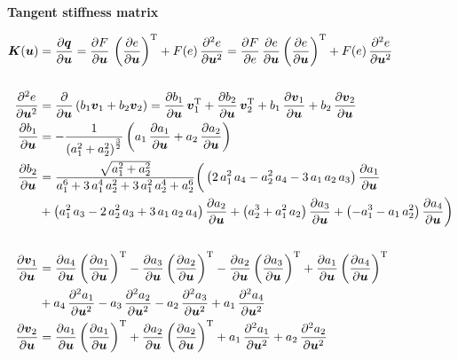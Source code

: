 \textbf{Tangent stiffness matrix}

\begin{align*}
\boldsymbol{K}(\boldsymbol{u}) &= \frac{\partial \boldsymbol{q}}{\partial \boldsymbol{u}} = \frac{\partial F}{\partial \boldsymbol{u}}\,\left(\frac{\partial e}{\partial \boldsymbol{u}}\right)^{\rm{T}} + F(e)\,\frac{\partial^2 e}{\partial \boldsymbol{u}^2} = \frac{\partial F}{\partial e}\,\frac{\partial e}{\partial \boldsymbol{u}}\left(\frac{\partial e}{\partial \boldsymbol{u}}\right)^{\rm{T}} + F(e)\,\frac{\partial^2 e}{\partial \boldsymbol{u}^2}\\
\\
\frac{\partial^2 e}{\partial \boldsymbol{u}^2} &= \frac{\partial}{\partial \boldsymbol{u}}\left(b_1\boldsymbol{v}_1 + b_2\boldsymbol{v}_2\right) = \frac{\partial b_1}{\partial \boldsymbol{u}}\,\boldsymbol{v}_1^{\rm{T}} + \frac{\partial b_2}{\partial \boldsymbol{u}}\,\boldsymbol{v}_2^{\rm{T}} + b_1\,\frac{\partial \boldsymbol{v}_1}{\partial \boldsymbol{u}} + b_2\,\frac{\partial \boldsymbol{v}_2}{\partial \boldsymbol{u}}\\
\frac{\partial b_1}{\partial \boldsymbol{u}} &= -\frac{1}{\left(a_1^2 + a_2^2\right)^{\frac{3}{2}}}\left(a_1\,\frac{\partial a_1}{\partial \boldsymbol{u}} + a_2\,\frac{\partial a_2}{\partial \boldsymbol{u}}\right)\\
\frac{\partial b_2}{\partial \boldsymbol{u}} &= \frac{\sqrt{a_1^2 + a_2^2}}{a_1^6 + 3\,a_1^4\,a_2^2 + 3\,a_1^2\,a_2^4 + a_2^6}\bigg(\left(2\,a_1^2\,a_4 - a_2^2\,a_4 - 3\,a_1\,a_2\,a_3\right)\frac{\partial a_1}{\partial \boldsymbol{u}}\\
&+ \left(a_1^2\,a_3 - 2\,a_2^2\,a_3 + 3\,a_1\,a_2\,a_4\right)\frac{\partial a_2}{\partial \boldsymbol{u}} + \left(a_2^3 + a_1^2\,a_2\right)\frac{\partial a_3}{\partial \boldsymbol{u}} + \left(-a_1^3 - a_1\,a_2^2\right)\frac{\partial a_4}{\partial \boldsymbol{u}}\bigg)\\
\\
\frac{\partial \boldsymbol{v}_1}{\partial \boldsymbol{u}} &= \frac{\partial a_4}{\partial \boldsymbol{u}}\left(\frac{\partial a_1}{\partial \boldsymbol{u}}\right)^{\rm{T}} - \frac{\partial a_3}{\partial \boldsymbol{u}}\left(\frac{\partial a_2}{\partial \boldsymbol{u}}\right)^{\rm{T}} - \frac{\partial a_2}{\partial \boldsymbol{u}}\left(\frac{\partial a_3}{\partial \boldsymbol{u}}\right)^{\rm{T}} + \frac{\partial a_1}{\partial \boldsymbol{u}}\left(\frac{\partial a_4}{\partial \boldsymbol{u}}\right)^{\rm{T}}\\
&+ a_4\,\frac{\partial^2 a_1}{\partial \boldsymbol{u}^2} - a_3\,\frac{\partial^2 a_2}{\partial \boldsymbol{u}^2} - a_2\,\frac{\partial^2 a_3}{\partial \boldsymbol{u}^2} + a_1\,\frac{\partial^2 a_4}{\partial \boldsymbol{u}^2}\\
\frac{\partial \boldsymbol{v}_2}{\partial \boldsymbol{u}} &=  \frac{\partial a_1}{\partial \boldsymbol{u}}\left(\frac{\partial a_1}{\partial \boldsymbol{u}}\right)^{\rm{T}} + \frac{\partial a_2}{\partial \boldsymbol{u}}\left(\frac{\partial a_2}{\partial \boldsymbol{u}}\right)^{\rm{T}} + a_1\,\frac{\partial^2 a_1}{\partial \boldsymbol{u}^2} + a_2\,\frac{\partial^2 a_2}{\partial \boldsymbol{u}^2}
\end{align*}

